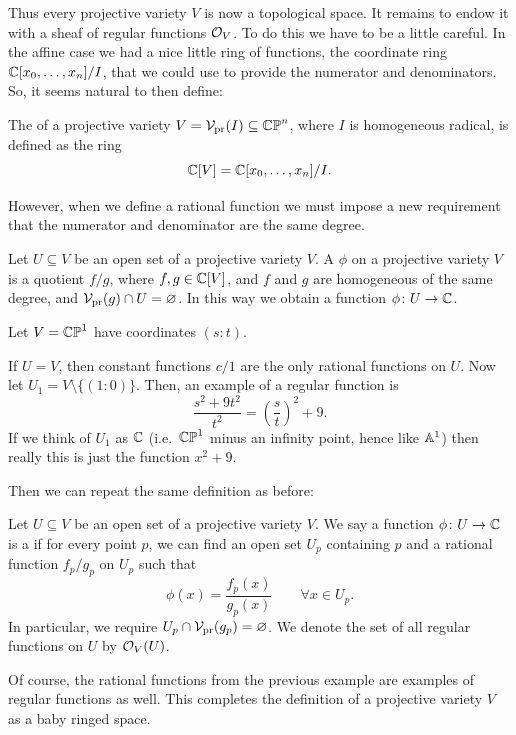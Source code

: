 Thus every projective variety $V$ is now a topological space.
It remains to endow it with a sheaf of regular functions $\mathcal O_V$.
To do this we have to be a little careful.
In the affine case we had a nice little ring of functions,
the coordinate ring $\mathbb C[x_0,\dots,x_n] / I$,
that we could use to provide the numerator and denominators.
So, it seems natural to then define:
\begin{definition}
	The  of a projective variety
	$V = \mathcal V_{\text{pr}}(I) \subseteq \mathbb{CP}^n$, where $I$ is homogeneous radical,
	is defined as the ring
	\[ \mathbb C[V] = \mathbb C[x_0, \dots, x_n] / I. \]
\end{definition}
However, when we define a rational function we must impose
a new requirement that the numerator and denominator are the same degree.
\begin{definition}
	Let $U \subseteq V$ be an open set of a projective variety $V$.
	A  $\phi$ on a projective variety $V$
	is a quotient $f/g$, where $f,g \in \mathbb C[V]$,
	and $f$ and $g$ are homogeneous of the same degree,
	and $\mathcal V_{\text{pr}}(g) \cap U = \varnothing$.
	In this way we obtain a function $\phi \colon U \to \mathbb C$.
\end{definition}
\begin{example}
	Let $V = \mathbb{CP}^1$ have coordinates $(s:t)$.
	\begin{enumerate}[(a)]
		\ii If $U = V$, then constant functions $c/1$
		are the only rational functions on $U$.
		\ii Now let $U_1 = V \setminus \{(1:0)\}$.
		Then, an example of a regular function is
		\[ \frac{s^2+9t^2}{t^2} = \left( \frac st \right)^2 + 9. \]
		If we think of $U_1$ as $\mathbb C$
		(i.e.\ $\mathbb{CP}^1$ minus an infinity point, hence like $\mathbb A^1$)
		then really this is just the function $x^2+9$.
	\end{enumerate}
\end{example}
Then we can repeat the same definition as before:
\begin{definition}
	Let $U \subseteq V$ be an open set of a projective variety $V$.
	We say a function $\phi \colon U \to \mathbb C$ is a  if
	for every point $p$, we can find an open set $U_p$ containing $p$
	and a rational function $f_p/g_p$ on $U_p$ such that
	\[ \phi(x) = \frac{f_p(x)}{g_p(x)} \qquad \forall x \in U_p. \]
	In particular, we require $U_p \cap \mathcal V_{\text{pr}}(g_p) = \varnothing$.
	We denote the set of all regular functions on $U$ by $\mathcal O_V(U)$.
\end{definition}
Of course, the rational functions from the previous example
are examples of regular functions as well.
This completes the definition of a projective variety $V$
as a baby ringed space.

